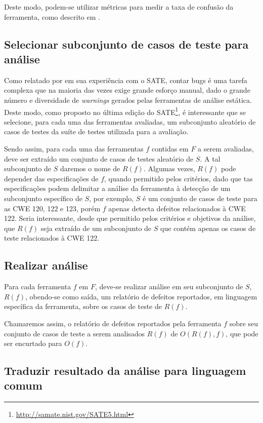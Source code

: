 Deste modo, podem-se utilizar métricas para medir a taxa de confusão da ferramenta, como descrito em \cite{nsa}.

\subsection{Selecionar subconjunto de casos de teste para análise}

Como relatado por \cite{seatbelts} em sua experiência com o SATE, contar bugs é uma tarefa complexa que na maioria das vezes exige grande esforço manual, dado o grande número e diversidade de \textit{warnings} gerados pelas ferramentas de análise estática. Deste modo, como proposto no última edição do SATE\footnote{\url{http://samate.nist.gov/SATE5.html}}, é interessante que se selecione, para cada uma das ferramentas avaliadas, um subconjunto aleatório de casos de testes da suíte de testes utilizada para a avaliação.

Sendo assim, para cada uma das ferramentas $f$ contidas em $F$ a serem avaliadas,  deve ser extraído um conjunto de casos de testes aleatório de $S$. A tal subconjunto de $S$ daremos o nome de $R(f)$. Algumas vezes, $R(f)$ pode depender das especificações de $f$, quando permitido pelos critérios, dado que tas especificações podem delimitar a análise da ferramenta à detecção de um subconjunto específico de $S$, por exemplo, $S$ é um conjunto de casos de teste para as CWE 120, 122 e 123, porém $f$ apenas detecta defeitos relacionados à CWE 122. Seria interessante, desde que permitido pelos critérios e objetivos da análise, que $R(f)$ seja extraído de um subconjunto de $S$ que contém apenas os casos de teste relacionados à CWE 122.

\subsection{Realizar análise}

Para cada ferramenta $f$ em $F$, deve-se realizar análise em seu subconjunto de $S$, $R(f)$, obendo-se como saída, um relatório de defeitos reportados, em linguagem específica da ferramenta, sobre os casos de teste de $R(f)$.

Chamaremos assim, o relatório de defeitos reportados pela ferramenta $f$ sobre seu conjunto de casos de teste a serem analisados $R(f)$ de $O(R(f), f)$, que pode ser encurtado para $O(f)$.

\subsection{Traduzir resultado da análise para linguagem comum}

